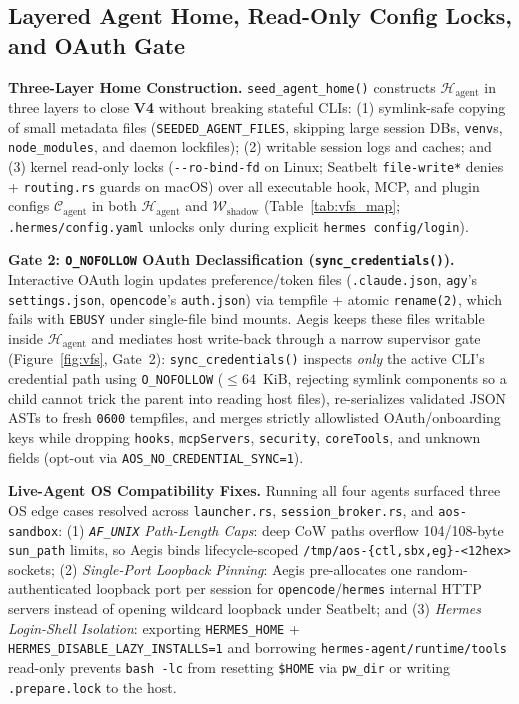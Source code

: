 \documentclass[10pt,journal,compsoc]{IEEEtran}
\begin{document}
\subsection{Layered Agent Home, Read-Only Config Locks, and OAuth Gate}

\noindent\textbf{Three-Layer Home Construction.}
\texttt{seed\_agent\_home()} constructs $\mathcal{H}_{\text{agent}}$ in three layers to close \textbf{V4} without breaking stateful CLIs: (1) symlink-safe copying of small metadata files (\texttt{SEEDED\_AGENT\_FILES}, skipping large session DBs, \texttt{venv}s, \texttt{node\_modules}, and daemon lockfiles); (2) writable session logs and caches; and (3) kernel read-only locks (\texttt{-\/-ro-bind-fd} on Linux; Seatbelt \texttt{file-write*} denies + \texttt{routing.rs} guards on macOS) over all executable hook, MCP, and plugin configs $\mathcal{C}_{\text{agent}}$ in both $\mathcal{H}_{\text{agent}}$ and $\mathcal{W}_{\text{shadow}}$ (Table~\ref{tab:vfs_map}; \texttt{.hermes/config.yaml} unlocks only during explicit \texttt{hermes config/login}).

\noindent\textbf{Gate 2: \texttt{O\_NOFOLLOW} OAuth Declassification (\texttt{sync\_credentials()}).}
Interactive OAuth login updates preference/token files (\texttt{.claude.json}, \texttt{agy}'s \texttt{settings.json}, \texttt{opencode}'s \texttt{auth.json}) via tempfile + atomic \texttt{rename(2)}, which fails with \texttt{EBUSY} under single-file bind mounts. Aegis keeps these files writable inside $\mathcal{H}_{\text{agent}}$ and mediates host write-back through a narrow supervisor gate (Figure~\ref{fig:vfs}, Gate~2): \texttt{sync\_credentials()} inspects \emph{only} the active CLI's credential path using \texttt{O\_NOFOLLOW} ($\le 64$~KiB, rejecting symlink components so a child cannot trick the parent into reading host files), re-serializes validated JSON ASTs to fresh \texttt{0600} tempfiles, and merges strictly allowlisted OAuth/onboarding keys while dropping \texttt{hooks}, \texttt{mcpServers}, \texttt{security}, \texttt{coreTools}, and unknown fields (opt-out via \texttt{AOS\_NO\_CREDENTIAL\_SYNC=1}).

\noindent\textbf{Live-Agent OS Compatibility Fixes.}
Running all four agents surfaced three OS edge cases resolved across \texttt{launcher.rs}, \texttt{session\_broker.rs}, and \texttt{aos-sandbox}: (1) \emph{\texttt{AF\_UNIX} Path-Length Caps}: deep CoW paths overflow 104/108-byte \texttt{sun\_path} limits, so Aegis binds lifecycle-scoped \texttt{/tmp/aos-\{ctl,sbx,eg\}-<12hex>} sockets; (2) \emph{Single-Port Loopback Pinning}: Aegis pre-allocates one random-authenticated loopback port per session for \texttt{opencode}/\texttt{hermes} internal HTTP servers instead of opening wildcard loopback under Seatbelt; and (3) \emph{Hermes Login-Shell Isolation}: exporting \texttt{HERMES\_HOME} + \texttt{HERMES\_\allowbreak DISABLE\_\allowbreak LAZY\_\allowbreak INSTALLS=1} and borrowing \texttt{hermes-agent/\allowbreak runtime/\allowbreak tools} read-only prevents \texttt{bash -lc} from resetting \texttt{\$HOME} via \texttt{pw\_dir} or writing \texttt{.prepare.lock} to the host.
\end{document}
